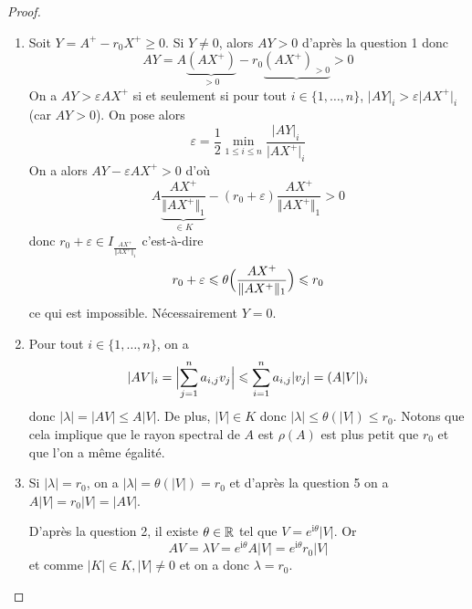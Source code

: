 \begin{proof}
\begin{enumerate}
		\item Soit $Y=A^{+}-r_{0}X^{+}\geqslant0$. Si $Y\neq0$, alors $AY>0$ d'après la question 1 donc 
		\begin{equation}AY=A\underbrace{(AX^{+})}_{>0}-r_{0}\underbrace{(AX^{+})_{>0}}>0\end{equation}
		On a $AY>\varepsilon AX^{+}$ si et seulement si pour tout $i\in\{1,\dots,n\}$, $\vert AY\vert_{i}>\varepsilon\vert AX^{+}\vert_{i}$ (car $AY>0$). On pose alors 
		\begin{equation}\varepsilon=\frac{1}{2}\min\limits_{1\leqslant i\leqslant n}\frac{\vert AY\vert_{i}}{\vert AX^{+}\vert_{i}}\end{equation}
		On a alors $AY-\varepsilon AX^{+}>0$ d'où 
		\begin{equation}A\underbrace{\frac{AX^{+}}{\Vert AX^{+}\Vert_{1}}}_{\in K}-(r_{0}+\varepsilon)\frac{AX^{+}}{\Vert AX^{+}\Vert_{1}}>0\end{equation}
		donc $r_{0}+\varepsilon\in I_{\frac{AX^{+}}{\Vert AX^{+}\Vert_{1}}}$ c'est-à-dire 
		\begin{equation}r_{0}+\varepsilon\leqslant\theta\Bigl(\frac{AX^{+}}{\Vert AX^{+}\Vert_{1}}\Bigr)\leqslant r_{0}\end{equation}
		ce qui est impossible. Nécessairement $Y=0$.

		\item Pour tout $i\in\{1,\dots,n\}$, on a 
		\begin{equation}\vert AV\vert_{i}=\Bigl\lvert\sum_{j=1}^{n}a_{i,j}v_{j}\Bigr\rvert\leqslant\sum_{i=1}^{n}a_{i,j}\vert v_{j}\vert=(A\vert V\vert)_{i}\end{equation}
		donc $\vert\lambda\vert=\vert AV\vert\leqslant A\vert V\vert$. De plus, $\vert V\vert\in K$ donc $\vert\lambda\vert\leqslant\theta(\vert V\vert)\leqslant r_{0}$. Notons que cela implique que le rayon spectral de $A$ est $\rho(A)$ est plus petit que $r_{0}$ et que l'on a même égalité.

		\item Si $\vert\lambda\vert=r_{0}$, on a $\vert\lambda\vert=\theta(\vert V\vert)=r_{0}$ et d'après la question 5 on a $A\vert V\vert=r_{0}\vert V\vert=\vert AV\vert$.
		
		D'après la question 2, il existe $\theta\in\mathbb{R}$ tel que $V=e^{\mathrm{i}\theta}\vert V\vert$. Or 
		\begin{equation}AV=\lambda V=e^{\mathrm{i}\theta}A\vert V\vert=e^{\mathrm{i}\theta}r_{0}\vert V\vert\end{equation}
		et comme $\vert K\vert\in K, \vert V\vert\neq0$ et on a donc $\lambda=r_{0}$.


\end{enumerate}
\end{proof}
